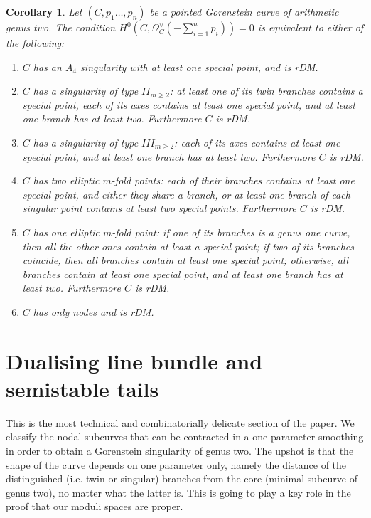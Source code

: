 \documentclass[11pt]{amsart}
\theoremstyle{plain}
\newtheorem{cor}[thm]{Corollary}
\theoremstyle{definition}
\begin{document}
\begin{cor}
 Let $(C,p_1\ldots,p_n)$ be a pointed Gorenstein curve of arithmetic genus two. The condition $H^0(C,\Omega_C^\vee(-\sum_{i=1}^n p_i))=0$ is equivalent to either of the following:
 \begin{enumerate}[leftmargin=.6cm]
  \item $C$ has an $A_4$ singularity with at least one special point, and is rDM.
  \item $C$ has a singularity of type $I\!I_{m\geq 2}$: at least one of its twin branches contains a special point, each of its axes contains at least one special point, and at least one branch has at least two. Furthermore $C$ is rDM.
  \item $C$ has a singularity of type $I\!I\!I_{m\geq 2}$: each of its axes contains at least one special point, and at least one branch has at least two. Furthermore $C$ is rDM.
  \item $C$ has two elliptic $m$-fold points: each of their branches contains at least one special point, and either they share a branch, or at least one branch of each singular point contains at least two special points. Furthermore $C$ is rDM.
  \item $C$ has one elliptic $m$-fold point: if one of its branches is a genus one curve, then all the other ones contain at least a special point; if two of its branches coincide, then all branches contain at least one special point; otherwise, all branches contain at least one special point, and at least one branch has at least two. Furthermore $C$ is rDM.
  \item $C$ has only nodes and is rDM.
 \end{enumerate}
\end{cor}

\section{Dualising line bundle and semistable tails}
This is the most technical and combinatorially delicate section of the paper. We classify the nodal subcurves that can be contracted in a one-parameter smoothing in order to obtain a Gorenstein singularity of genus two. The upshot is that the shape of the curve depends on one parameter only, namely the distance of the distinguished (i.e. twin or singular) branches from the core (minimal subcurve of genus two), no matter what the latter is. This is going to play a key role in the proof that our moduli spaces are proper.
\end{document}
